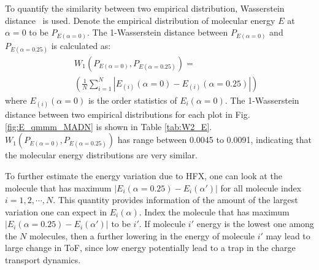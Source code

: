 \documentclass[%
 reprint,
 amsmath,amssymb,
 aps,
]{revtex4-2}
\begin{document}
To quantify the similarity between two empirical distribution, Wasserstein distance~\cite{villani_optimal_2009} is used.
Denote the empirical distribution of molecular energy $E$ at $\alpha=0$ to be $P_{E(\alpha=0)}$. 
The 1-Wasserstein distance between $P_{E(\alpha=0)}$ and $P_{E(\alpha=0.25)}$ is calculated as:
\begin{eqnarray}
    && W_1 (P_{E(\alpha=0)}, P_{E(\alpha=0.25)}) = \nonumber \\
    && (\frac{1}{N} \sum\limits_{i=1}^N | E_{(i)}(\alpha=0) - E_{(i)}(\alpha=0.25) |)
\end{eqnarray}
where $E_{(i)}(\alpha=0)$ is the order statistics of $E_i(\alpha=0)$. The 1-Wasserstein distance between two empirical distributions for each plot in Fig. \ref{fig:E_qmmm_MADN} is shown in Table \ref{tab:W2_E}. $W_1 (P_{E(\alpha=0)}, P_{E(\alpha=0.25)})$ has range between 0.0045 to 0.0091, indicating that the molecular energy distributions are very similar. 


To further estimate the energy variation due to HFX, one can look at the molecule that has maximum $|E_i(\alpha=0.25) - E_i(\alpha')|$ for all molecule index $i=1,2,\cdots,N$. 
This quantity provides information of the amount of the largest variation one can expect in $E_i(\alpha)$. Index the molecule that has maximum $|E_i(\alpha=0.25) - E_i(\alpha')|$ to be $i'$. 
If molecule $i'$ energy is the lowest one among the $N$ molecules, then a further lowering in the energy of molecule $i'$ may lead to large change in ToF, since low energy potentially lead to a trap in the charge transport dynamics. 
\end{document}
